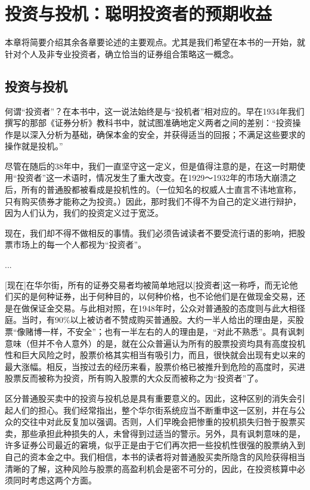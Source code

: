 \documentclass[12pt,oneside]{book}
\begin{document}
\section{投资与投机：聪明投资者的预期收益}
本章将简要介绍其余各章要论述的主要观点。尤其是我们希望在本书的一开始，就针对个人及非专业投资者，确立恰当的证券组合策略这一概念。

\subsection{投资与投机}
何谓“投资者”？在本书中，这一说法始终是与“投机者”相对应的。早在1934年我们撰写的那部《证券分析》教科书中，就试图准确地定义两者之间的差别：“投资操作是以深入分析为基础，确保本金的安全，并获得适当的回报；不满足这些要求的操作就是投机。”

尽管在随后的38年中，我们一直坚守这一定义，但是值得注意的是，在这一时期使用“投资者”这一术语时，情况发生了重大改变。在1929～1932年的市场大崩溃之后，所有的普通股都被看成是投机性的。（一位知名的权威人士直言不讳地宣称，只有购买债券才能称之为投资。）因此，那时我们不得不为自己的定义进行辩护，因为人们认为，我们的投资定义过于宽泛。

现在，我们却不得不做相反的事情。我们必须告诫读者不要受流行语的影响，把股票市场上的每一个人都视为“投资者”。

...

[现在]在华尔街，所有的证券交易者均被简单地冠以[投资者]这一称呼，而无论他们买的是何种证券，出于何种目的，以何种价格，也不论他们是在做现金交易，还是在做保证金交易。与此相对照，在1948年时，公众对普通股的态度则与此大相径庭。当时，有90\%以上被访者不赞成购买普通股。大约一半人给出的理由是，买股票“像赌博一样，不安全”；也有一半左右的人的理由是，“对此不熟悉”。具有讽刺意味（但并不令人意外）的是，就在公众普遍认为所有的股票投资均具有高度投机性和巨大风险之时，股票价格其实相当有吸引力，而且，很快就会出现有史以来的最大涨幅。相反，当按过去的经历来看，股票价格已被推升到危险的高度时，买进股票反而被称为投资，所有购入股票的大众反而被称之为“投资者”了。

区分普通股买卖中的投资与投机总是具有重要意义的。因此，这种区别的消失会引起人们的担心。我们经常指出，整个华尔街系统应当不断重申这一区别，并在与公众的交往中对此反复加以强调。否则，人们早晚会把惨重的投机损失归咎于股票买卖，那些承担此种损失的人，未曾得到过适当的警示。另外，具有讽刺意味的是，许多证券公司最近的窘境，似乎正是由于它们再次把一些投机性很强的股票纳入到自己的资本金之中。我们相信，本书的读者将对普通股买卖所隐含的风险获得相当清晰的了解，这种风险与股票的高盈利机会是密不可分的，因此，在投资核算中必须同时考虑这两个方面。
\end{document}
